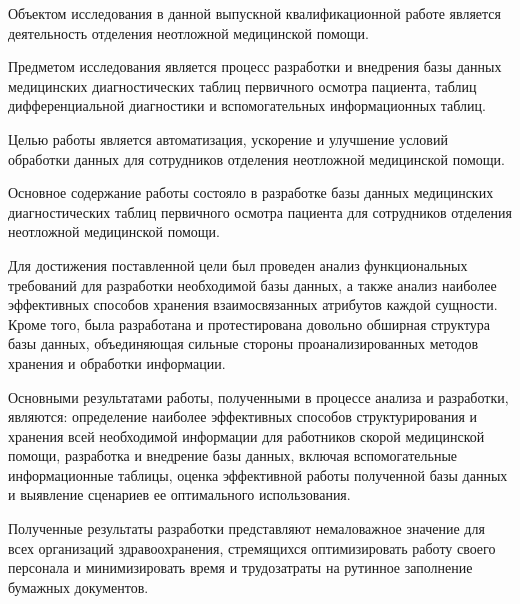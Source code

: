 \abstract %


Объектом исследования в данной выпускной квалификационной работе является деятельность отделения неотложной медицинской помощи.

Предметом исследования является процесс разработки и внедрения базы данных медицинских диагностических таблиц первичного осмотра пациента, таблиц дифференциальной диагностики и вспомогательных информационных таблиц.

Целью работы является автоматизация, ускорение и улучшение условий обработки данных для сотрудников отделения неотложной медицинской помощи.

Основное содержание работы состояло в разработке базы данных медицинских диагностических таблиц первичного осмотра пациента для сотрудников отделения неотложной медицинской помощи.

Для достижения поставленной цели был проведен анализ функциональных требований для разработки необходимой базы данных, а также анализ наиболее эффективных способов хранения взаимосвязанных атрибутов каждой сущности. Кроме того, была разработана и протестирована довольно обширная структура базы данных, объединяющая сильные стороны проанализированных методов хранения и обработки информации.

Основными результатами работы, полученными в процессе анализа и разработки, являются: определение наиболее эффективных способов структурирования и хранения всей необходимой информации для работников скорой медицинской помощи, разработка и внедрение базы данных, включая вспомогательные информационные таблицы, оценка эффективной работы полученной базы данных и выявление сценариев ее оптимального использования.

Полученные результаты разработки представляют немаловажное значение для всех организаций здравоохранения, стремящихся оптимизировать работу своего персонала и минимизировать время и трудозатраты на рутинное заполнение бумажных документов.